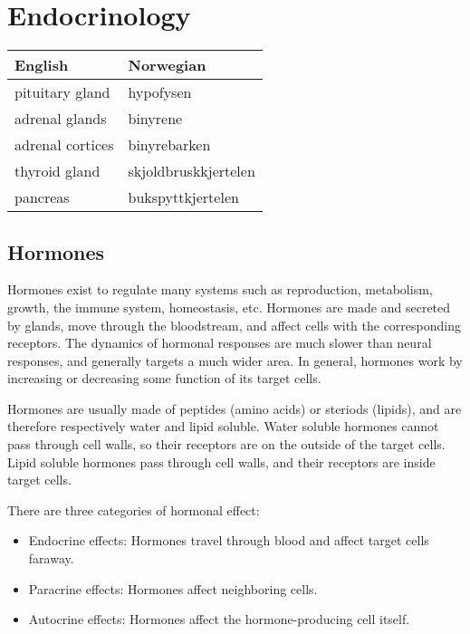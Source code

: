 \section{Endocrinology}
\begin{table}[htbp]
  \centering
  \begin{tabular}{ll}
    \toprule
    English & Norwegian \\
    \midrule
    pituitary gland & hypofysen \\
    adrenal glands & binyrene \\
    adrenal cortices & binyrebarken \\
    thyroid gland & skjoldbruskkjertelen \\
    pancreas & bukspyttkjertelen \\
    \bottomrule
  \end{tabular}
\end{table}

\subsection{Hormones}
Hormones exist to regulate many systems such as reproduction, metabolism, growth, the immune system, homeostasis, etc. Hormones are made and secreted by glands, move through the bloodstream, and affect cells with the corresponding receptors. The dynamics of hormonal responses are much slower than neural responses, and generally targets a much wider area. In general, hormones work by increasing or decreasing some function of its target cells.

Hormones are usually made of peptides (amino acids) or steriods (lipids), and are therefore respectively water and lipid soluble. Water soluble hormones cannot pass through cell walls, so their receptors are on the outside of the target cells. Lipid soluble hormones pass through cell walls, and their receptors are inside target cells.

There are three categories of hormonal effect:
\begin{itemize}
  \item Endocrine effects: Hormones travel through blood and affect target cells faraway.
  \item Paracrine effects: Hormones affect neighboring cells.
  \item Autocrine effects: Hormones affect the hormone-producing cell itself.
\end{itemize}

